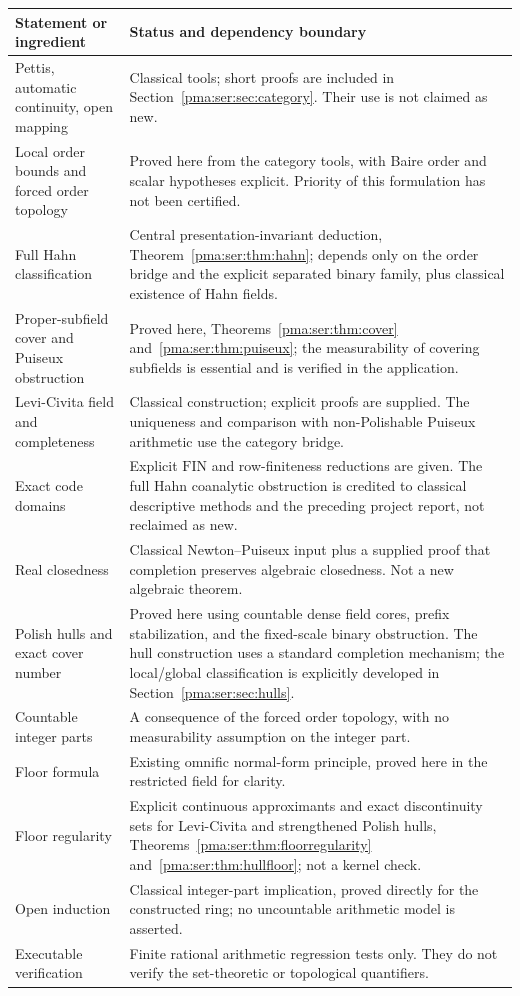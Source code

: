 \documentclass[11pt]{article}
\numberwithin{equation}{section}
\theoremstyle{definition}
\theoremstyle{remark}
\newcommand{\FIN}{\mathrm{FIN}}
\begin{document}
\begin{longtable}{@{}>{\raggedright\arraybackslash}p{}>{\raggedright\arraybackslash}p{}@{}}
\toprule
Statement or ingredient & Status and dependency boundary\\
\midrule\endhead
Pettis, automatic continuity, open mapping & Classical tools; short proofs
are included in Section~\ref{pma:ser:sec:category}. Their use is not claimed as new.\\[.45em]
Local order bounds and forced order topology & Proved here from the category
tools, with Baire order and scalar hypotheses explicit. Priority of this
formulation has not been certified.\\[.45em]
Full Hahn classification & Central presentation-invariant deduction,
Theorem~\ref{pma:ser:thm:hahn}; depends only on the order bridge and the explicit
separated binary family, plus classical existence of Hahn fields.\\[.45em]
Proper-subfield cover and Puiseux obstruction & Proved here,
Theorems~\ref{pma:ser:thm:cover} and~\ref{pma:ser:thm:puiseux}; the measurability of covering
subfields is essential and is verified in the application.\\[.45em]
Levi-Civita field and completeness & Classical construction; explicit proofs
are supplied. The uniqueness and comparison with non-Polishable Puiseux
arithmetic use the category bridge.\\[.45em]
Exact code domains & Explicit $\FIN$ and row-finiteness reductions are given.
The full Hahn coanalytic obstruction is credited to classical descriptive
methods and the preceding project report, not reclaimed as new.\\[.45em]
Real closedness & Classical Newton--Puiseux input plus a supplied proof that
completion preserves algebraic closedness. Not a new algebraic theorem.\\[.45em]
Polish hulls and exact cover number & Proved here using countable dense
field cores, prefix stabilization, and the fixed-scale binary obstruction.
The hull construction uses a standard completion mechanism; the local/global
classification is explicitly developed in Section~\ref{pma:ser:sec:hulls}.\\[.45em]
Countable integer parts & A consequence of the forced order topology, with no
measurability assumption on the integer part.\\[.45em]
Floor formula & Existing omnific normal-form principle, proved here in the
restricted field for clarity.\\[.45em]
Floor regularity & Explicit continuous approximants and exact discontinuity
sets for Levi-Civita and strengthened Polish hulls,
Theorems~\ref{pma:ser:thm:floorregularity} and~\ref{pma:ser:thm:hullfloor}; not a kernel check.\\[.45em]
Open induction & Classical integer-part implication, proved directly for the
constructed ring; no uncountable arithmetic model is asserted.\\[.45em]
Executable verification & Finite rational arithmetic regression tests only.
They do not verify the set-theoretic or topological quantifiers.\\
\bottomrule
\end{longtable}
\end{document}
